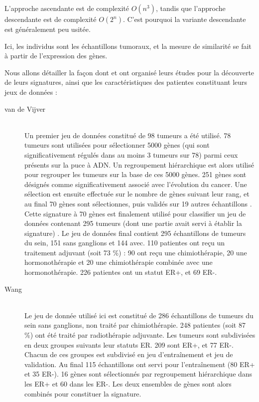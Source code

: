       L'approche ascendante est de complexité $O(n^{3})$, tandis que l'approche descendante est de complexité $O(2^{n})$.
      C'est pourquoi la variante descendante est généralement peu usitée.

      Ici, les individus sont les échantillons tumoraux, et la mesure de similarité se fait à partir de l'expression des gènes.

      Nous allons détailler la façon dont \citeauthor{vandevijver2002} et \citeauthor{Wang2005} ont organisé leurs études pour la découverte de leurs signatures, ainsi que les caractéristiques des patientes constituant leurs jeux de données :
      \begin{description}
        \item [van de Vijver \citep{vandevijver2002}] \hfill \\
          Un premier jeu de données constitué de 98 tumeurs a été utilisé.
          78 tumeurs sont utilisées pour sélectionner 5000 gènes (qui sont significativement régulés dans au moins 3 tumeurs sur 78) parmi ceux présents sur la puce à \acs{ADN}.
          Un regroupement hiérarchique est alors utilisé pour regrouper les tumeurs sur la base de ces 5000 gènes.
          251 gènes sont désignés comme significativement associé avec l'évolution du cancer.
          Une sélection est ensuite effectuée sur le nombre de gènes suivant leur rang, et au final 70 gènes sont sélectionnes, puis validés sur 19 autres échantillons \citep{vantveer2002}.
          Cette signature à 70 gènes est finalement utilisé pour classifier un jeu de données contenant 295 tumeurs (dont une partie avait servi à établir la signature) \citep{vandevijver2002}.
          Le jeu de données final contient 295 échantillons de tumeurs du sein, 151 sans ganglions et 144 avec.
          110 patientes ont reçu un traitement adjuvant (soit 73 \%) : 90 ont reçu une chimiothérapie, 20 une hormonothérapie et 20 une chimiothérapie combinée avec une hormonothérapie.
          226 patientes ont un statut \acs{ER+}, et 69 \acs{ER-}.
\pagebreak
        \item [Wang \citep{Wang2005}]                  \hfill \\
          Le jeu de donnée utilisé ici est constitué de 286 échantillons de tumeurs du sein sans ganglions, non traité par chimiothérapie.
          248 patientes (soit 87 \%) ont été traité par radiothérapie adjuvante.
          Les tumeurs sont subdivisées en deux groupes suivants leur statuts \acs{ER}.
          209 sont \acs{ER+}, et 77 \acs{ER-}.
          Chacun de ces groupes est subdivisé en jeu d'entraînement et jeu de validation.
          Au final 115 échantillons ont servi pour l'entraînement (80 \acs{ER+} et 35 \acs{ER-}).
          16 gènes sont sélectionnés par regroupement hiérarchique dans les \acs{ER+} et 60 dans les \acs{ER-}.
          Les deux ensembles de gènes sont alors combinés pour constituer la signature.
      \end{description}
      \vspace{1.5ex}

